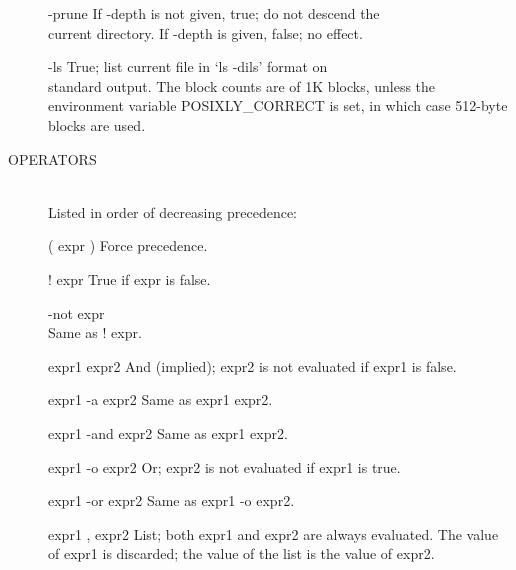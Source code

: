 \begin{description}
       -prune If -depth is not given, true; do  not  descend  the \\
              current directory.
              If -depth is given, false; no effect.

       -ls    True;  list  current  file  in `ls -dils' format on \\
              standard  output.   The  block  counts  are  of  1K
              blocks,    unless    the    environment    variable
              POSIXLY_CORRECT is  set,  in  which  case  512-byte
              blocks are used.

\item[OPERATORS] \hfill \\
       Listed in order of decreasing precedence:

       ( expr )
              Force precedence.

       ! expr True if expr is false.

       -not expr \\
              Same as ! expr.

       expr1 expr2
              And  (implied);  expr2 is not evaluated if expr1 is
              false.

       expr1 -a expr2
              Same as expr1 expr2.

       expr1 -and expr2
              Same as expr1 expr2.

       expr1 -o expr2
              Or; expr2 is not evaluated if expr1 is true.

       expr1 -or expr2
              Same as expr1 -o expr2.

       expr1 , expr2
              List; both expr1 and expr2  are  always  evaluated.
              The  value  of expr1 is discarded; the value of the
              list is the value of expr2.
\end{description}

